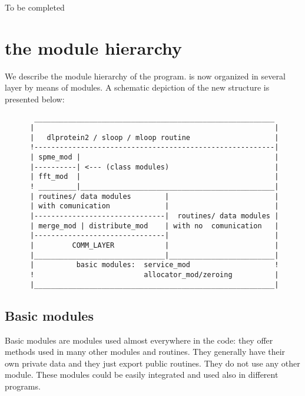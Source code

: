 To be completed 
\chapter{ the \PR module hierarchy }

We describe the module hierarchy of the program. \PR is now organized in
several layer by means of \fort modules. A schematic depiction of the new
structure is presented below:   


\begin{verbatim}
       _________________________________________________________ 
      |                                                         |
      |   dlprotein2 / sloop / mloop routine                    |
      !---------------------------------------------------------|
      | spme_mod |                                              |
      |----------| <--- (class modules)                         |
      | fft_mod  |                                              |
      ! _________|______________________________________________| 
      | routines/ data modules        |                         | 
      | with comunication             |                         | 
      |-------------------------------|  routines/ data modules |
      | merge_mod | distribute_mod    | with no  comunication   | 
      |-------------------------------|                         |
      |         COMM_LAYER            |                         |
      |_______________________________|_________________________|
      |          basic modules:  service_mod                    !
      !                          allocator_mod/zeroing          |           
      |_________________________________________________________| 
\end{verbatim}

\section{ Basic modules }

Basic modules are modules used almost everywhere in the code: they offer
methods used in many other modules and routines. They generally have their
own private data and they just export public routines. They do not use any
other module. These modules could be easily integrated and used
also in different programs.
  
